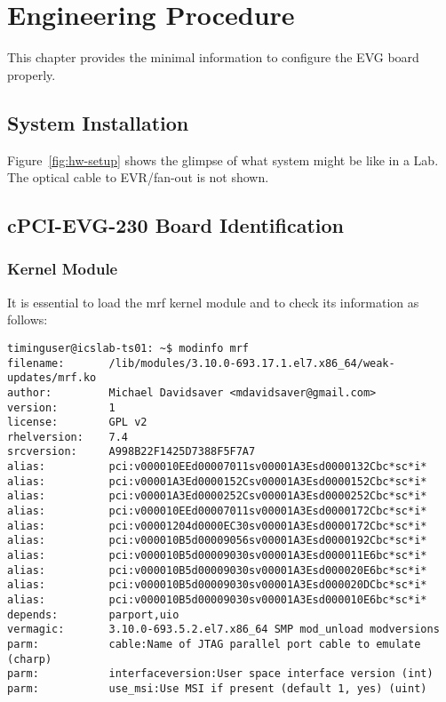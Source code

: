 \documentclass[11pt
  , a4paper
  , article
  , oneside
  , showtrims
]{memoir}
\begin{document}
\clearpage
\chapter{Engineering Procedure}
This chapter provides the minimal information to configure the EVG board properly.

\section{System Installation}
Figure~\ref{fig:hw-setup} shows the glimpse of what system might be like in a Lab. The optical cable to EVR/fan-out is not shown.

\section{cPCI-EVG-230 Board Identification}

\subsection{Kernel Module}
It is essential to load the mrf kernel module and to check its information as follows:
\begin{lstlisting}[style=termstyle]
timinguser@icslab-ts01: ~$ modinfo mrf
filename:       /lib/modules/3.10.0-693.17.1.el7.x86_64/weak-updates/mrf.ko
author:         Michael Davidsaver <mdavidsaver@gmail.com>
version:        1
license:        GPL v2
rhelversion:    7.4
srcversion:     A998B22F1425D7388F5F7A7
alias:          pci:v000010EEd00007011sv00001A3Esd0000132Cbc*sc*i*
alias:          pci:v00001A3Ed0000152Csv00001A3Esd0000152Cbc*sc*i*
alias:          pci:v00001A3Ed0000252Csv00001A3Esd0000252Cbc*sc*i*
alias:          pci:v000010EEd00007011sv00001A3Esd0000172Cbc*sc*i*
alias:          pci:v00001204d0000EC30sv00001A3Esd0000172Cbc*sc*i*
alias:          pci:v000010B5d00009056sv00001A3Esd0000192Cbc*sc*i*
alias:          pci:v000010B5d00009030sv00001A3Esd000011E6bc*sc*i*
alias:          pci:v000010B5d00009030sv00001A3Esd000020E6bc*sc*i*
alias:          pci:v000010B5d00009030sv00001A3Esd000020DCbc*sc*i*
alias:          pci:v000010B5d00009030sv00001A3Esd000010E6bc*sc*i*
depends:        parport,uio
vermagic:       3.10.0-693.5.2.el7.x86_64 SMP mod_unload modversions
parm:           cable:Name of JTAG parallel port cable to emulate (charp)
parm:           interfaceversion:User space interface version (int)
parm:           use_msi:Use MSI if present (default 1, yes) (uint)
\end{lstlisting}
\end{document}
